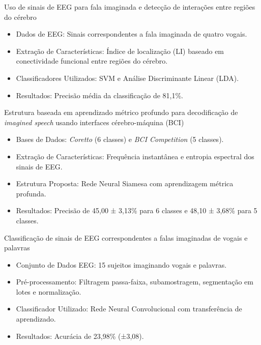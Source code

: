\documentclass{beamer}
\begin{document}
	\begin{frame}{Uso de sinais de EEG para fala imaginada e detecção de interações entre regiões do cérebro \cite{bakhshali2022investigating}}
		\begin{itemize}
			\item Dados de EEG: Sinais correspondentes a fala imaginada de quatro vogais.
			\item Extração de Características: Índice de localização (LI) baseado em conectividade funcional entre regiões do cérebro.
			\item Classificadores Utilizados: SVM e Análise Discriminante Linear (LDA).
			\item Resultados: Precisão média da classificação de 81,1\%.
		\end{itemize}
		
	\end{frame}
	
	\begin{frame}{Estrutura baseada em aprendizado métrico profundo para decodificação de \textit{imagined speech} usando interfaces cérebro-máquina (BCI) \cite{lee2021decoding}}
		\begin{itemize}
			\item Bases de Dados: \textit{Coretto} (6 classes) e \textit{BCI Competition} (5 classes).
			\item Extração de Características: Frequência instantânea e entropia espectral dos sinais de EEG.
			\item Estrutura Proposta: Rede Neural Siamesa com aprendizagem métrica profunda.
			\item Resultados: Precisão de 45,00 ± 3,13\% para 6 classes e 48,10 ± 3,68\% para 5 classes.
		\end{itemize}
		
	\end{frame}

	\begin{frame}{Classificação de sinais de EEG correspondentes a falas imaginadas de vogais e palavras \cite{tamm2020classification}}
		\begin{itemize}
			\item Conjunto de Dados EEG: 15 sujeitos imaginando vogais e palavras.
			\item Pré-processamento: Filtragem passa-faixa, subamostragem, segmentação em lotes e normalização.
			\item Classificador Utilizado: Rede Neural Convolucional com transferência de aprendizado.
			\item Resultados: Acurácia de 23,98\% (±3,08).
		\end{itemize}
		
	\end{frame}
	
\end{document}
